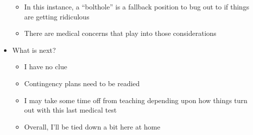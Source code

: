 \begin{itemize}
  \begin{itemize}
  \tightlist
  \item
    In this instance, a ``bolthole'' is a fallback position to bug out
    to if things are getting ridiculous
  \item
    There are medical concerns that play into those considerations
  \end{itemize}
\item
  What is next?

  \begin{itemize}
  \tightlist
  \item
    I have no clue
  \item
    Contingency plans need to be readied
  \item
    I may take some time off from teaching depending upon how things
    turn out with this last medical test
  \item
    Overall, I'll be tied down a bit here at home
  \end{itemize}
\end{itemize}
